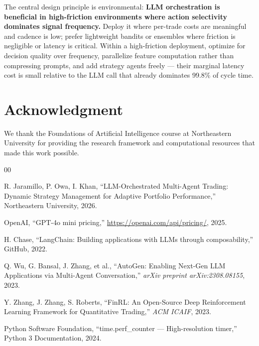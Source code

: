 \documentclass[10pt,conference]{IEEEtran}
\begin{document}
The central design principle is environmental: \textbf{LLM orchestration is beneficial in high-friction environments where action selectivity dominates signal frequency.} Deploy it where per-trade costs are meaningful and cadence is low; prefer lightweight bandits or ensembles where friction is negligible or latency is critical. Within a high-friction deployment, optimize for decision quality over frequency, parallelize feature computation rather than compressing prompts, and add strategy agents freely --- their marginal latency cost is small relative to the LLM call that already dominates 99.8\% of cycle time.


\section*{Acknowledgment}

We thank the Foundations of Artificial Intelligence course at Northeastern University for providing the research framework and computational resources that made this work possible.

\begin{thebibliography}{00}

R. Jaramillo, P. Owa, I. Khan, ``LLM-Orchestrated Multi-Agent Trading: Dynamic Strategy Management for Adaptive Portfolio Performance,'' Northeastern University, 2026.

OpenAI, ``GPT-4o mini pricing,'' \url{https://openai.com/api/pricing/}, 2025.

H. Chase, ``LangChain: Building applications with LLMs through composability,'' GitHub, 2022.

Q. Wu, G. Bansal, J. Zhang, et al., ``AutoGen: Enabling Next-Gen LLM Applications via Multi-Agent Conversation,'' \textit{arXiv preprint arXiv:2308.08155}, 2023.

Y. Zhang, J. Zhang, S. Roberts, ``FinRL: An Open-Source Deep Reinforcement Learning Framework for Quantitative Trading,'' \textit{ACM ICAIF}, 2023.

Python Software Foundation, ``time.perf\_counter --- High-resolution timer,'' Python 3 Documentation, 2024.

\end{thebibliography}
\end{document}
